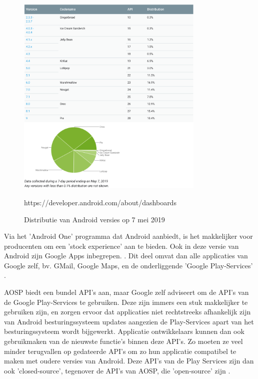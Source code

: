 \begin{figure}
    \centering
    \includegraphics[width=0.8\textwidth]{img/fragmentation.png}
    \caption{Distributie van Android versies op 7 mei 2019}
    \label{fig:androidfragmentation}
    \medskip
    \small
    https://developer.android.com/about/dashboards
    
\end{figure}

Via het 'Android One' programma dat Android aanbiedt, is het makkelijker voor producenten om een 'stock experience' aan te bieden. Ook in deze versie van Android zijn Google Apps inbegrepen. \autocite{android_androidone}.  Dit deel omvat dan alle applicaties van Google zelf, bv. GMail, Google Maps, en de onderliggende 'Google Play-Services' \autocite{amadeo_open-source}.

AOSP biedt een bundel API's  aan, maar Google zelf adviseert om de API's van de Google Play-Services te gebruiken. Deze zijn immers een stuk makkelijker te gebruiken zijn, en zorgen ervoor dat applicaties niet rechtstreeks afhankelijk zijn van Android besturingssysteem updates aangezien de Play-Services apart van het besturingssysteem wordt bijgewerkt. Applicatie ontwikkelaars kunnen dan ook gebruikmaken van de nieuwste functie's binnen deze API's. Zo moeten ze veel minder terugvallen op gedateerde API's om zo hun applicatie compatibel te maken met oudere versies van Android.  Deze API's van de Play Services zijn dan ook 'closed-source', tegenover de API's van AOSP, die 'open-source' zijn \autocite{marshall_google-play-services} . 

